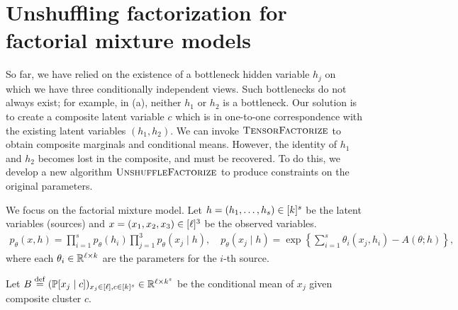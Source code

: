 \section{Unshuffling factorization for factorial mixture models} \label{sec:factorialModels}

So far, we have relied on the existence of a bottleneck hidden variable $h_j$ on which
we have three conditionally independent views.  Such bottlenecks do not always
exist; for example, in (a), neither $h_1$ or $h_2$ is a bottleneck.
Our solution is to create a composite latent variable $c$ which is in
one-to-one correspondence with the existing latent variables $(h_1,h_2)$.
We can invoke $\text{\sc TensorFactorize}$ to obtain composite marginals and
conditional means.  However, the identity of $h_1$ and $h_2$ becomes lost in the composite,
and must be recovered.  To do this, we develop a new algorithm $\text{\sc UnshuffleFactorize}$
to produce constraints on the original parameters.



We focus on the factorial mixture model.
Let $h = (h_1, \dots, h_s) \in [k]^s$ be the latent variables (sources)
and $x = (x_1, x_2, x_3) \in [\ell]^3$ be the observed variables.
\begin{align}
p_\theta(x, h) = \prod_{i=1}^s p_\theta(h_i) \prod_{j=1}^3 p_\theta(x_j \mid h), \quad
p_\theta(x_j \mid h) = \exp\left\{ \sum_{i=1}^s \theta_i(x_j, h_i) - A(\theta; h) \right\},
\end{align}
where each $\theta_i \in \mathbb{R}^{\ell \times k}$ are the parameters for the $i$-th source.

Let $B \stackrel{\rm def}{=} (\mathbb{P}[x_j \mid c])_{x_j \in [\ell],c \in [k]^s} \in
\mathbb{R}^{\ell \times k^s}$ be the conditional mean of $x_j$ given composite cluster $c$.


